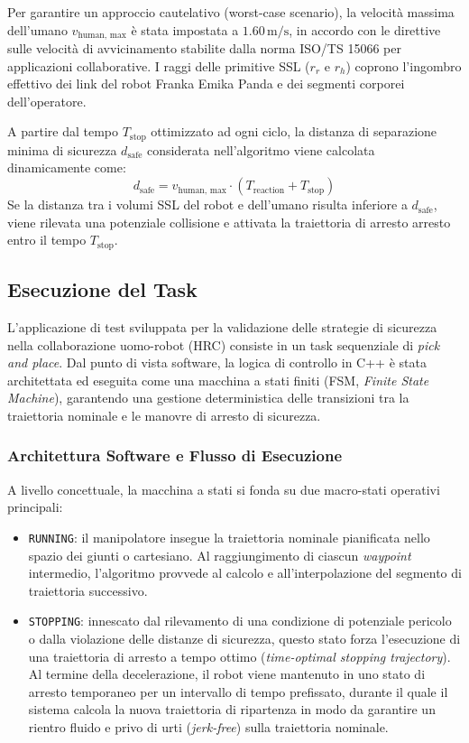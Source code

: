 Per garantire un approccio cautelativo (worst-case scenario), la velocità massima dell'umano $v_{\text{human, max}}$ è stata impostata a $1.60\,\text{m/s}$, in accordo con le direttive sulle velocità di avvicinamento stabilite dalla norma ISO/TS 15066 per applicazioni collaborative. I raggi delle primitive SSL ($r_r$ e $r_h$) coprono l'ingombro effettivo dei link del robot Franka Emika Panda e dei segmenti corporei dell'operatore.

A partire dal tempo $T_{\text{stop}}$ ottimizzato ad ogni ciclo, la distanza di separazione minima di sicurezza $d_{\text{safe}}$ considerata nell'algoritmo viene calcolata dinamicamente come:
\begin{equation}
d_{\text{safe}} = v_{\text{human, max}} \cdot \left( T_{\text{reaction}} + T_{\text{stop}} \right)
\label{eq:d_safe}
\end{equation}
Se la distanza tra i volumi SSL del robot e dell'umano risulta inferiore a $d_{\text{safe}}$, viene rilevata una potenziale collisione e attivata la traiettoria di arresto arresto entro il tempo $T_{\text{stop}}$.

\subsection{Esecuzione del Task}
L'applicazione di test sviluppata per la validazione delle strategie di sicurezza nella collaborazione uomo-robot (HRC) consiste in un task sequenziale di \textit{pick and place}. Dal punto di vista software, la logica di controllo in C++ è stata architettata ed eseguita come una macchina a stati finiti (FSM, \textit{Finite State Machine}), garantendo una gestione deterministica delle transizioni tra la traiettoria nominale e le manovre di arresto di sicurezza.

\subsubsection{Architettura Software e Flusso di Esecuzione}
A livello concettuale, la macchina a stati si fonda su due macro-stati operativi principali:
\begin{itemize}
	\item \texttt{RUNNING}: il manipolatore insegue la traiettoria nominale pianificata nello spazio dei giunti o cartesiano. Al raggiungimento di ciascun \textit{waypoint} intermedio, l'algoritmo provvede al calcolo e all'interpolazione del segmento di traiettoria successivo.
	\item \texttt{STOPPING}: innescato dal rilevamento di una condizione di potenziale pericolo o dalla violazione delle distanze di sicurezza, questo stato forza l'esecuzione di una traiettoria di arresto a tempo ottimo (\textit{time-optimal stopping trajectory}). Al termine della decelerazione, il robot viene mantenuto in uno stato di arresto temporaneo per un intervallo di tempo prefissato, durante il quale il sistema calcola la nuova traiettoria di ripartenza in modo da garantire un rientro fluido e privo di urti (\textit{jerk-free}) sulla traiettoria nominale.
\end{itemize}

